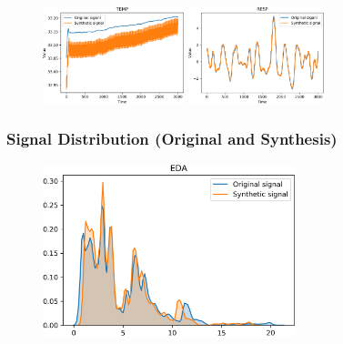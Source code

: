 \documentclass[unknownkeysallowed]{beamer}
\begin{document}
\begin{frame}
\begin{figure}
  \hfill
  \includegraphics[width=.24\textwidth, height=2.8cm]{figs/sig_stress_Temp_acii2019_pres.png}\hfill
  \includegraphics[width=.24\textwidth, height=2.8cm]{figs/sig_stress_Resp_acii2019_pres.png}\hfill

  \label{sig_plot}
\end{figure}

\end{frame}


\begin{frame}
\frametitle{Signal Distribution (Original and Synthesis)}


\begin{figure}
  \centering
  \includegraphics[width=.5\textwidth, height=5cm]{figs/dist_stress_EDA_acii2019_pres.png}\hfill

  \label{dist_plt}
\end{figure}

\end{frame}
\end{document}
